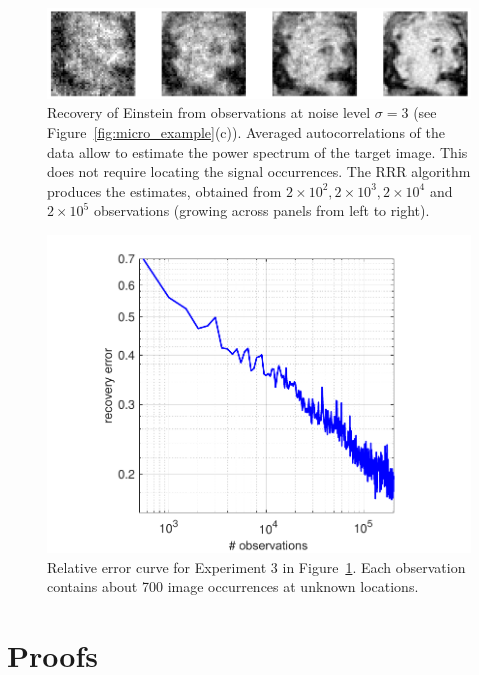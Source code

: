 \documentclass[12pt]{article}
\newcommand{\1}{\mathbf{1}}
\theoremstyle{plain}
\theoremstyle{definition}
\theoremstyle{remark}
\theoremstyle{plain}
\theoremstyle{remark}
\theoremstyle{plain}
\theoremstyle{plain}
\theoremstyle{plain}
\numberwithin{equation}{section}
\begin{document}
\begin{figure}[t]
	\centering
	\includegraphics[width=1\linewidth]{Einstien_progress_examples}
	\caption{\label{fig:Einst_example} Recovery of Einstein from observations at noise level $\sigma = 3$ (see Figure~\ref{fig:micro_example}(c)). Averaged autocorrelations of the data allow to estimate the power spectrum of the target image. This does not require locating the signal occurrences. The RRR algorithm produces the estimates,  obtained from $2\times 10^2,2\times 10^3,2\times 10^4$ and $2\times 10^5$ observations (growing across panels from left to right).}	
\end{figure}


\begin{figure}[h]
	\centering
	\includegraphics[width=.8\linewidth]{Einstein_recovery_error}
	\caption{\label{fig:error_per_micro}Relative error curve for Experiment 3 in Figure~\ref{fig:Einst_example}. Each observation contains about 700 image occurrences at unknown locations.}
\end{figure}

\section{Proofs}

\end{document}
